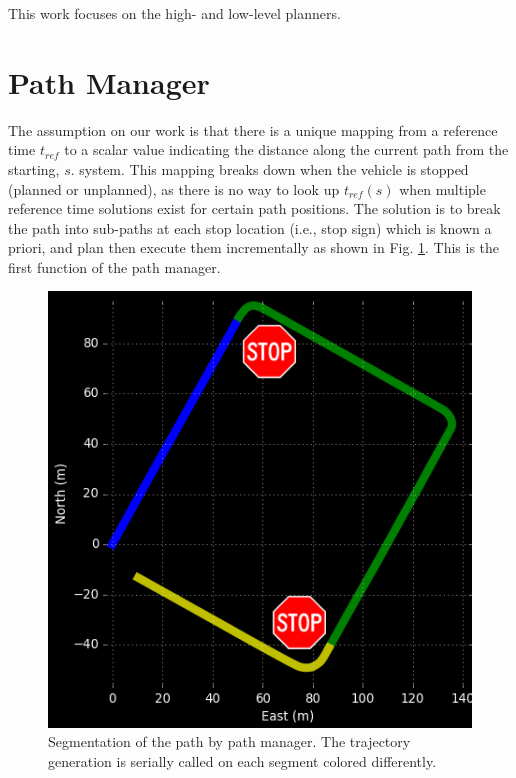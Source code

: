 \documentclass[letterpaper, 10 pt, conference]{ieeeconf}  %
\begin{document}
This work focuses on the high- and low-level planners.


\section{Path Manager} \label{sec:pathmanager}


The assumption on our work is that there is a unique mapping from a reference time $t_{ref}$ to a scalar value indicating the distance along the current path from the starting, $s$.
system.
This mapping breaks down when the vehicle is stopped (planned or unplanned), as there is no way to look up $t_{ref}(s)$ when multiple reference time solutions exist for certain path positions.
The solution is to break the path into sub-paths at each stop location (i.e., stop sign) which is known a priori, and plan then execute them incrementally as shown in Fig. \ref{fig:segmentation}.
This is the first function of the path manager.

\begin{figure}[thpb]
  \centering
  \includegraphics[width=0.5\columnwidth]{graphics/Subpaths.png}
  \caption{
    Segmentation of the path by path manager.
    The trajectory generation is serially called on each segment colored differently.
  }
  \label{fig:segmentation}
\end{figure}
\end{document}
